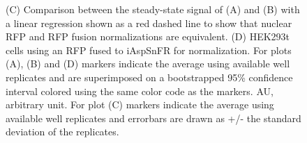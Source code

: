 \documentclass[9pt,lineno]{elife}
\begin{document}
\begin{figure}[ht!]
{(C) Comparison between the steady-state signal of (A) and (B) with a linear regression shown as a red dashed line to show that nuclear RFP and RFP fusion normalizations are equivalent.
(D) HEK293t cells using an RFP fused to iAspSnFR for normalization.
For plots (A), (B) and (D) markers indicate the average using available well replicates and are superimposed on a bootstrapped 95\% confidence interval colored using the same color code as the markers.
AU, arbitrary unit.
For plot (C) markers indicate the average using available well replicates and errorbars are drawn as +/- the standard deviation of the replicates.
}{}\label{figsupp:f2S1}
\label{figsupp:f2S2}
\end{figure}
\end{document}
